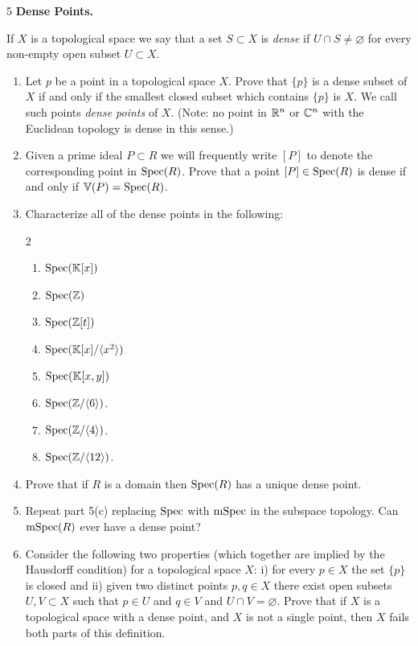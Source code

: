 \documentclass[Notebook.tex]{subfiles}
\begin{document}
\newpage


\begin{problem}{5}
    \textbf{Dense Points.} 
    
    If $X$ is a topological space we say that a set $S \subset X$ is \emph{dense} if $U\cap S \neq \varnothing$ for every non-empty open subset $U \subset X$. 
    \begin{enumerate}[label=(\alph*),ref=\theenumi\alph*]
        \item Let $p$ be a point in a topological space $X$. Prove that  $\{p\}$ is a dense subset of $X$ if and only if the smallest closed subset which contains $\{p\}$ is $X$. We call such points \emph{dense points} of $X$. (Note: no point in $\mathbb R^n$ or $\mathbb C^n$ with the Euclidean topology is dense in this sense.)
        \item Given a prime ideal $P \subset R$ we will frequently write $[P]$ to denote the corresponding point in $\operatorname{Spec}(R)$. Prove that a point $[P] \in \operatorname{Spec}(R)$ is dense if and only if $\mathbb V(P) = \operatorname{Spec}(R)$.
        \item\label{ex-pt:dense-points-exm} Characterize all of the dense points in the following: 
            \begin{multicols}{2}
                \begin{enumerate}[label=(\roman*), ref=\theenumi\roman*]
                \item $\operatorname{Spec}(\mathbb K[x])$
                \item $\operatorname{Spec}(\mathbb Z)$
                \item $\operatorname{Spec}(\mathbb Z[t])$
                \item $\operatorname{Spec}(\mathbb K[x]/\langle x^{2}\rangle)$
                \item $\operatorname{Spec}(\mathbb K[x,y])$
                \item $\operatorname{Spec}(\mathbb Z/\langle 6\rangle)$.
                \item $\operatorname{Spec}(\mathbb Z/\langle 4\rangle)$.
                \item $\operatorname{Spec}(\mathbb Z/\langle 12\rangle)$.
            \end{enumerate}
            \end{multicols}
        \item Prove that if $R$ is a domain then $\operatorname{Spec}(R)$ has a unique dense point. 
        \item Repeat part 5(c) replacing $\operatorname{Spec}$ with $\operatorname{mSpec}$ in the subspace topology. Can $\operatorname{mSpec}(R)$ ever have a dense point?
        \item Consider the following two properties (which together are implied by the Hausdorff condition) for a topological space $X$: i) for every $p \in X$ the set $\{p\}$ is closed and ii) given two distinct points $p,q\in X$ there exist open subsets $U,V \subset X$ such that $p \in U$ and $q \in V$ and $U\cap V = \varnothing$. Prove that if $X$ is a topological space with a dense point, and $X$ is not a single point, then $X$ fails both parts of this definition. 
	\end{enumerate}
\end{problem}
\end{document}
